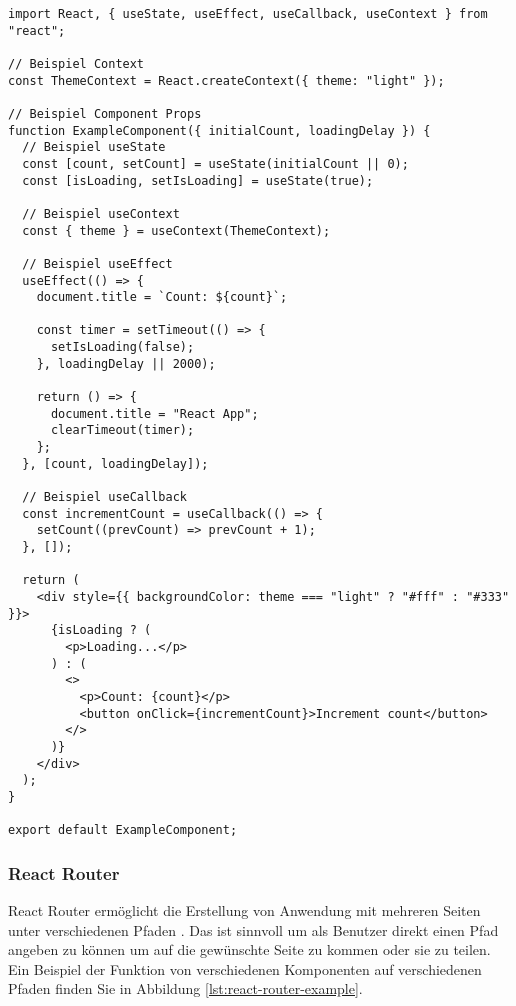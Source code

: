 \begin{lstlisting}[style=codeStyle, caption={Beispiel einer React Komponente}, label={lst:react-example}]
import React, { useState, useEffect, useCallback, useContext } from "react";

// Beispiel Context
const ThemeContext = React.createContext({ theme: "light" });

// Beispiel Component Props
function ExampleComponent({ initialCount, loadingDelay }) {
  // Beispiel useState
  const [count, setCount] = useState(initialCount || 0);
  const [isLoading, setIsLoading] = useState(true);

  // Beispiel useContext
  const { theme } = useContext(ThemeContext);

  // Beispiel useEffect
  useEffect(() => {
    document.title = `Count: ${count}`;

    const timer = setTimeout(() => {
      setIsLoading(false);
    }, loadingDelay || 2000);

    return () => {
      document.title = "React App";
      clearTimeout(timer);
    };
  }, [count, loadingDelay]);
  
  // Beispiel useCallback
  const incrementCount = useCallback(() => {
    setCount((prevCount) => prevCount + 1);
  }, []);

  return (
    <div style={{ backgroundColor: theme === "light" ? "#fff" : "#333" }}>
      {isLoading ? (
        <p>Loading...</p>
      ) : (
        <>
          <p>Count: {count}</p>
          <button onClick={incrementCount}>Increment count</button>
        </>
      )}
    </div>
  );
}

export default ExampleComponent;
\end{lstlisting}

\subsubsection{React Router}
\label{sec:react-router}
React Router ermöglicht die Erstellung von Anwendung mit mehreren Seiten unter verschiedenen Pfaden \cite{react-key-concepts}. Das ist sinnvoll um als Benutzer direkt einen Pfad angeben zu können um auf die gewünschte Seite zu kommen oder sie zu teilen. Ein Beispiel der Funktion von verschiedenen Komponenten auf verschiedenen Pfaden finden Sie in Abbildung \ref{lst:react-router-example}. 

